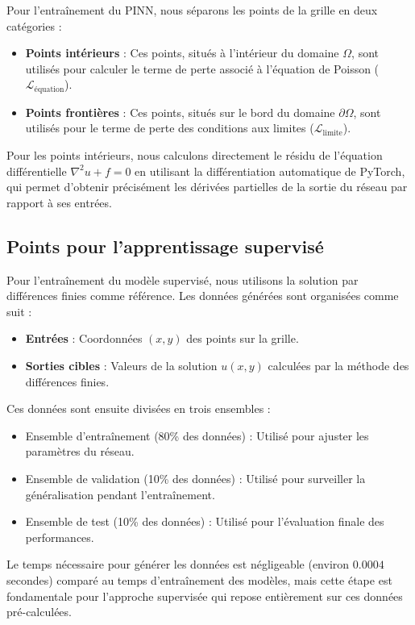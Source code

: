 \documentclass[11pt,a4paper]{article}
\begin{document}
Pour l'entraînement du PINN, nous séparons les points de la grille en deux catégories :
\begin{itemize}
    \item \textbf{Points intérieurs} : Ces points, situés à l'intérieur du domaine $\Omega$, sont utilisés pour calculer le terme de perte associé à l'équation de Poisson ($\mathcal{L}_\text{équation}$).
    \item \textbf{Points frontières} : Ces points, situés sur le bord du domaine $\partial\Omega$, sont utilisés pour le terme de perte des conditions aux limites ($\mathcal{L}_\text{limite}$).
\end{itemize}

Pour les points intérieurs, nous calculons directement le résidu de l'équation différentielle $\nabla^2 u + f = 0$ en utilisant la différentiation automatique de PyTorch, qui permet d'obtenir précisément les dérivées partielles de la sortie du réseau par rapport à ses entrées.

\subsection{Points pour l'apprentissage supervisé}

Pour l'entraînement du modèle supervisé, nous utilisons la solution par différences finies comme référence. Les données générées sont organisées comme suit :
\begin{itemize}
    \item \textbf{Entrées} : Coordonnées $(x, y)$ des points sur la grille.
    \item \textbf{Sorties cibles} : Valeurs de la solution $u(x, y)$ calculées par la méthode des différences finies.
\end{itemize}

Ces données sont ensuite divisées en trois ensembles :
\begin{itemize}
    \item Ensemble d'entraînement (80\% des données) : Utilisé pour ajuster les paramètres du réseau.
    \item Ensemble de validation (10\% des données) : Utilisé pour surveiller la généralisation pendant l'entraînement.
    \item Ensemble de test (10\% des données) : Utilisé pour l'évaluation finale des performances.
\end{itemize}

Le temps nécessaire pour générer les données est négligeable (environ $0.0004$ secondes) comparé au temps d'entraînement des modèles, mais cette étape est fondamentale pour l'approche supervisée qui repose entièrement sur ces données pré-calculées.
\end{document}
